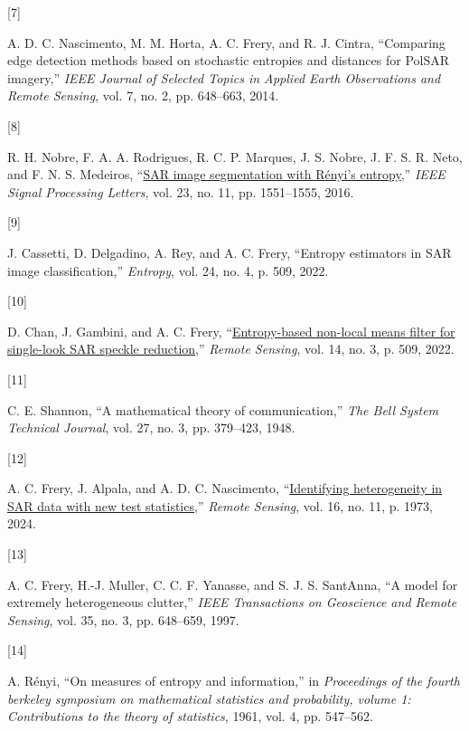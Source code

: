 \documentclass[
  journal,
]{IEEEtran}%
\newlength{\cslhangindent}
\newlength{\csllabelwidth}
\newenvironment{CSLReferences}[2] %
 {\begin{list}{}{%
  \setlength{\itemindent}{0pt}
  \setlength{\leftmargin}{0pt}
  \setlength{\parsep}{0pt}
  \ifodd #1
   \setlength{\leftmargin}{\cslhangindent}
   \setlength{\itemindent}{-1\cslhangindent}
  \fi
  \setlength{\itemsep}{#2\baselineskip}}}
 {\end{list}}
\newcommand{\CSLLeftMargin}[1]{\parbox[t]{\csllabelwidth}{\strut#1\strut}}
\newcommand{\CSLRightInline}[1]{\parbox[t]{\linewidth - \csllabelwidth}{\strut#1\strut}}
\begin{document}
\begin{CSLReferences}{0}{0}
\CSLLeftMargin{{[}7{]} }%
\CSLRightInline{A. D. C. Nascimento, M. M. Horta, A. C. Frery, and R. J.
Cintra, {``Comparing edge detection methods based on stochastic
entropies and distances for {PolSAR} imagery,''} \emph{{IEEE} Journal of
Selected Topics in Applied Earth Observations and Remote Sensing}, vol.
7, no. 2, pp. 648--663, 2014. }

\CSLLeftMargin{{[}8{]} }%
\CSLRightInline{R. H. Nobre, F. A. A. Rodrigues, R. C. P. Marques, J. S.
Nobre, J. F. S. R. Neto, and F. N. S. Medeiros,
{``\href{https://doi.org/10.1109/lsp.2016.2606760}{SAR image
segmentation with {R}ényi's entropy},''} \emph{IEEE Signal Processing
Letters}, vol. 23, no. 11, pp. 1551--1555, 2016. }

\CSLLeftMargin{{[}9{]} }%
\CSLRightInline{J. Cassetti, D. Delgadino, A. Rey, and A. C. Frery,
{``Entropy estimators in {SAR} image classification,''} \emph{Entropy},
vol. 24, no. 4, p. 509, 2022. }

\CSLLeftMargin{{[}10{]} }%
\CSLRightInline{D. Chan, J. Gambini, and A. C. Frery,
{``\href{https://doi.org/10.3390/rs14030509}{Entropy-based non-local
means filter for single-look SAR speckle reduction},''} \emph{Remote
Sensing}, vol. 14, no. 3, p. 509, 2022. }

\CSLLeftMargin{{[}11{]} }%
\CSLRightInline{C. E. Shannon, {``A mathematical theory of
communication,''} \emph{The Bell System Technical Journal}, vol. 27, no.
3, pp. 379--423, 1948. }

\CSLLeftMargin{{[}12{]} }%
\CSLRightInline{A. C. Frery, J. Alpala, and A. D. C. Nascimento,
{``\href{https://doi.org/10.3390/rs16111973}{Identifying heterogeneity
in SAR data with new test statistics},''} \emph{Remote Sensing}, vol.
16, no. 11, p. 1973, 2024. }

\CSLLeftMargin{{[}13{]} }%
\CSLRightInline{A. C. Frery, H.-J. Muller, C. C. F. Yanasse, and S. J.
S. SantAnna, {``A model for extremely heterogeneous clutter,''}
\emph{{IEEE} Transactions on Geoscience and Remote Sensing}, vol. 35,
no. 3, pp. 648--659, 1997. }

\CSLLeftMargin{{[}14{]} }%
\CSLRightInline{A. Rényi, {``On measures of entropy and information,''}
in \emph{Proceedings of the fourth berkeley symposium on mathematical
statistics and probability, volume 1: Contributions to the theory of
statistics}, 1961, vol. 4, pp. 547--562. }


\end{CSLReferences}
\end{document}
